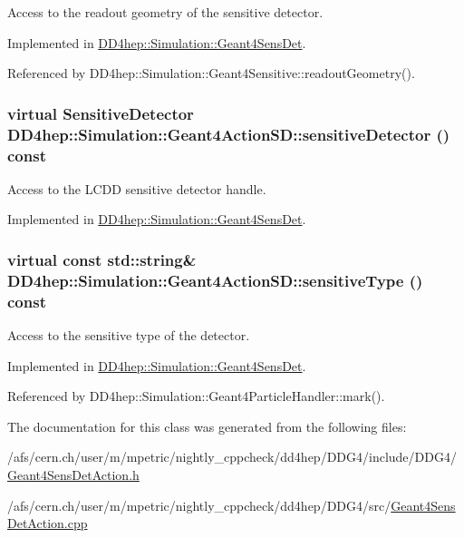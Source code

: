 Access to the readout geometry of the sensitive detector. 

Implemented in \hyperlink{class_d_d4hep_1_1_simulation_1_1_geant4_sens_det_a93a6d9cf9b58769cc5404762690cb3bc}{DD4hep::Simulation::Geant4SensDet}.

Referenced by DD4hep::Simulation::Geant4Sensitive::readoutGeometry().\hypertarget{class_d_d4hep_1_1_simulation_1_1_geant4_action_s_d_a8b1e15e8582895a6a7ad9ce4cf169e8e}{
\subsubsection[{sensitiveDetector}]{\setlength{\rightskip}{0pt plus 5cm}virtual {\bf SensitiveDetector} DD4hep::Simulation::Geant4ActionSD::sensitiveDetector () const}}
\label{class_d_d4hep_1_1_simulation_1_1_geant4_action_s_d_a8b1e15e8582895a6a7ad9ce4cf169e8e}


Access to the LCDD sensitive detector handle. 

Implemented in \hyperlink{class_d_d4hep_1_1_simulation_1_1_geant4_sens_det_ad55354b08f476e29a9195be11e4dbe8c}{DD4hep::Simulation::Geant4SensDet}.\hypertarget{class_d_d4hep_1_1_simulation_1_1_geant4_action_s_d_ad2aec470fc9632ab3082b51b16a75c00}{
\subsubsection[{sensitiveType}]{\setlength{\rightskip}{0pt plus 5cm}virtual const std::string\& DD4hep::Simulation::Geant4ActionSD::sensitiveType () const}}
\label{class_d_d4hep_1_1_simulation_1_1_geant4_action_s_d_ad2aec470fc9632ab3082b51b16a75c00}


Access to the sensitive type of the detector. 

Implemented in \hyperlink{class_d_d4hep_1_1_simulation_1_1_geant4_sens_det_a4a615f712c4ec113a536e3b6ffeb3c67}{DD4hep::Simulation::Geant4SensDet}.

Referenced by DD4hep::Simulation::Geant4ParticleHandler::mark().

The documentation for this class was generated from the following files:\begin{DoxyCompactItemize}
\item 
/afs/cern.ch/user/m/mpetric/nightly\_\-cppcheck/dd4hep/DDG4/include/DDG4/\hyperlink{_geant4_sens_det_action_8h}{Geant4SensDetAction.h}\item 
/afs/cern.ch/user/m/mpetric/nightly\_\-cppcheck/dd4hep/DDG4/src/\hyperlink{_geant4_sens_det_action_8cpp}{Geant4SensDetAction.cpp}\end{DoxyCompactItemize}
